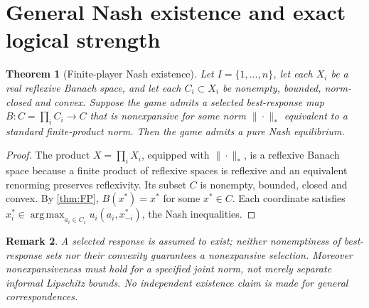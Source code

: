 \documentclass[11pt]{article}
\newtheorem{theorem}{Theorem}[section]
\newtheorem{remark}[theorem]{Remark}
\theoremstyle{definition}\newtheorem{definition}[theorem]{Definition}
\newcommand{\argmax}{\operatorname*{arg\,max}}
\begin{document}
\section{General Nash existence and exact logical strength}
\begin{theorem}[Finite-player Nash existence\label{thm:finite}]
Let $I=\{1,\ldots,n\}$, let each $X_i$ be a real reflexive Banach space, and let each $C_i\subset X_i$ be nonempty, bounded, norm-closed and convex. Suppose the game admits a selected best-response map $B:C=\prod_i C_i\to C$ that is nonexpansive for some norm $\|\cdot\|_*$ equivalent to a standard finite-product norm. Then the game admits a pure Nash equilibrium.
\end{theorem}
\begin{proof}
The product $X=\prod_iX_i$, equipped with $\|\cdot\|_*$, is a reflexive Banach space because a finite product of reflexive spaces is reflexive and an equivalent renorming preserves reflexivity. Its subset $C$ is nonempty, bounded, closed and convex. By \cref{thm:FP}, $B(x^*)=x^*$ for some $x^*\in C$. Each coordinate satisfies $x_i^*\in\argmax_{a_i\in C_i}u_i(a_i,x_{-i}^*)$, the Nash inequalities.
\end{proof}
\begin{remark}
A selected response is assumed to \emph{exist}; neither nonemptiness of best-response sets nor their convexity guarantees a nonexpansive selection. Moreover nonexpansiveness must hold for a specified joint norm, not merely separate informal Lipschitz bounds. No independent existence claim is made for general correspondences.
\end{remark}
\end{document}
